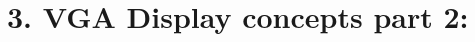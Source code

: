 \documentclass{article}
\begin{document}
\section{3. VGA Display concepts part 2:}
% 
% 
% 
% 
% 
% 
% 
\newpage
\end{document}
